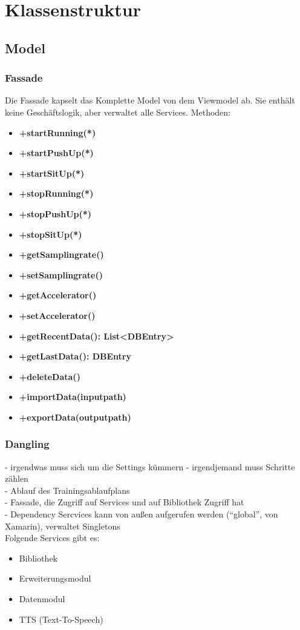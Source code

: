 \documentclass[a4paper,12pt]{article}
\author {ab Protokoll 12.3.19}
\begin{document}
\section{Klassenstruktur}

\subsection{Model}
\subsubsection{Fassade}
    Die Fassade kapselt das Komplette Model von dem Viewmodel ab.
    Sie enthält keine Geschäftslogik, aber verwaltet alle Services.
    Methoden: 
    \begin{itemize}
        \item \textbf{+startRunning(*)}
        \item \textbf{+startPushUp(*)}
        \item \textbf{+startSitUp(*)}
        \item \textbf{+stopRunning(*)}
        \item \textbf{+stopPushUp(*)}
        \item \textbf{+stopSitUp(*)}
        \item \textbf{+getSamplingrate()}
        \item \textbf{+setSamplingrate()}
        \item \textbf{+getAccelerator()}
        \item \textbf{+setAccelerator()}
        \item \textbf{+getRecentData(): List<DBEntry>} %
        \item \textbf{+getLastData(): DBEntry}  %
        \item \textbf{+deleteData()}
        \item \textbf{+importData(inputpath)}
        \item \textbf{+exportData(outputpath)}
    \end{itemize}

\subsubsection{Dangling}
- irgendwas muss sich um die Settings kümmern
- irgendjemand muss Schritte zählen\\
- Ablauf des Trainingsablaufplans\\
- Fassade, die Zugriff auf Services und auf Bibliothek Zugriff hat\\
- Dependency Sercvices kann von außen aufgerufen werden (``global'', von Xamarin), verwaltet Singletons\\
Folgende Services gibt es:
\begin{itemize}
    \item Bibliothek
    \item Erweiterungsmodul
    \item Datenmodul
    \item TTS (Text-To-Speech)
\end{itemize}
\end{document}
